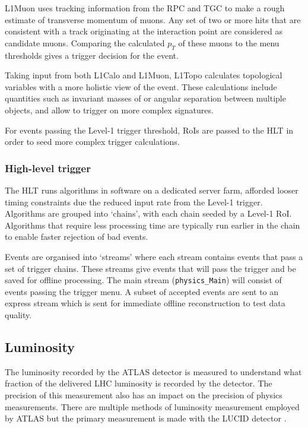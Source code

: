 L1Muon uses tracking information from the \ac{RPC} and \ac{TGC} to make a rough
estimate of transverse momentum of muons. Any set of two or more hits that are
consistent with a track originating at the interaction point are considered as
candidate muons. Comparing the calculated $p_T$ of these muons to the menu
thresholds gives a trigger decision for the event.

Taking input from both L1Calo and L1Muon, L1Topo calculates topological
variables with a more holistic view of the event. These calculations include
quantities such as invariant masses of or angular separation between multiple
objects, and allow to trigger on more complex signatures.

For events passing the Level-1 trigger threshold, \acp{RoI} are passed to the
\ac{HLT} in order to seed more complex trigger calculations.

\subsubsection{High-level trigger}

The \ac{HLT} runs algorithms in software on a dedicated server farm, afforded
looser timing constraints due the reduced input rate from the Level-1 trigger.
Algorithms are grouped into `chains', with each chain seeded by a Level-1
\ac{RoI}. Algorithms that require less processing time are typically run earlier
in the chain to enable faster rejection of bad events.

Events are organised into `streams' where each stream contains events that pass
a set of trigger chains. These streams give events that will pass the trigger
and be saved for offline processing. The main stream (\verb|physics_Main|)
will consist of events passing the trigger menu. A subset of accepted events are
sent to an express stream which is sent for immediate offline reconstruction to
test data quality.

\subsection{Luminosity}

The luminosity recorded by the \ac{ATLAS} detector is measured to understand
what fraction of the delivered \ac{LHC} luminosity is recorded by the detector.
The precision of this measurement also has an impact on the precision of physics
measurements. There are multiple methods of luminosity measurement employed by
\ac{ATLAS} but the primary measurement is made with the LUCID detector
\cite{Avoni2018}.

